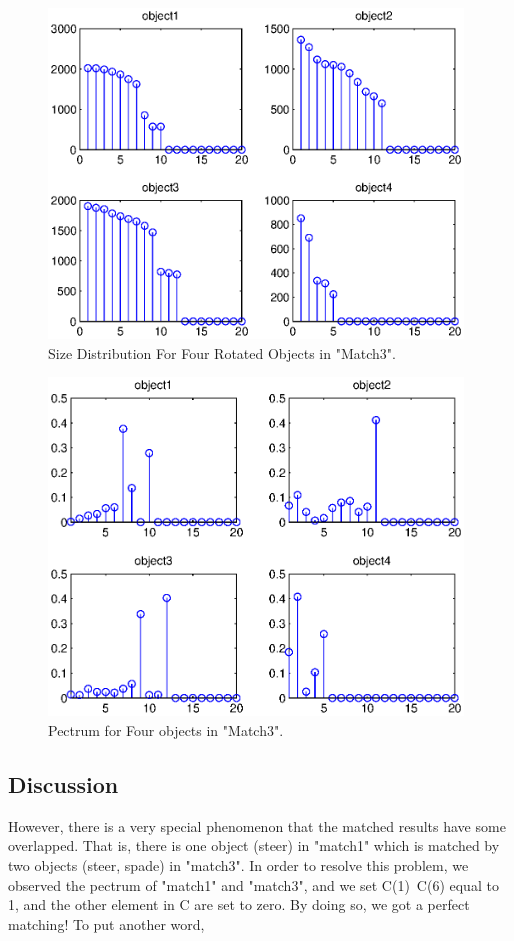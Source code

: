 \documentclass[paper=a4, fontsize=11pt]{scrartcl}
\begin{document}
\begin{figure}
	\centering
	\includegraphics[width=11cm]{size_distribution_for_rotaterd_4object.eps}
	\caption{Size Distribution For Four Rotated Objects in "Match3". }
	\label{fig:21}
\end{figure}

\begin{figure}
	\centering
	\includegraphics[width=11cm]{pecstrum_for_rotated_4object.eps}
	\caption{Pectrum for Four objects in "Match3". }
	\label{fig:22}
\end{figure}






\subsection{ Discussion }

	However, there is a very special phenomenon that the matched results have some overlapped. That is, there is one object (steer) in "match1" which is matched by two objects (steer, spade) in "match3".  In order to resolve this problem, we observed the pectrum of "match1" and "match3", and we set C(1)~C(6) equal to 1, and the other element in C are set to zero. By doing so, we got a perfect matching! To put another word,
\end{document}
